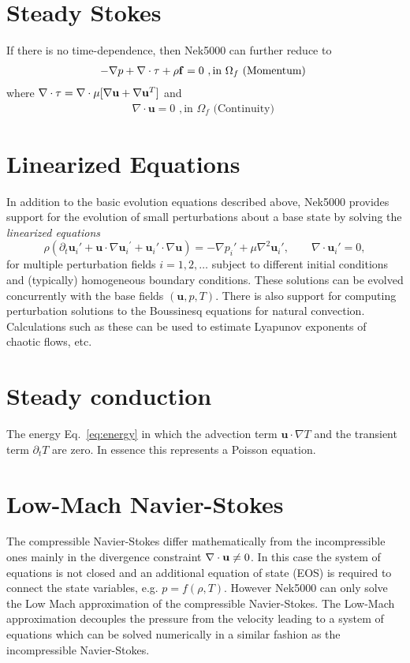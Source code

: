 {\section{Steady Stokes }
If there is no time-dependence, then Nek5000 can further reduce to
\begin{eqnarray}\label{eq:ns_momentum_steady_stokes}
 - \nabla p + \nabla \cdot \tau + \rho {\bf f}=0 \,\, , \text{in } \Omega_f \text{  (Momentum)  }
\end{eqnarray}
where \(\nabla \cdot\tau=\nabla\cdot\mu[\nabla \mathbf{u}+\nabla {\mathbf{u} }^{T}]\) and
\begin{eqnarray}\label{eq:ns_cont_steady_stokes}
 \nabla \cdot \mathbf u =0 \,\, , \text{in } \Omega_f  \text{  (Continuity)  } 
\end{eqnarray}

\section{Linearized Equations}
In addition to the basic evolution equations described above, Nek5000
provides support for the evolution of small perturbations about
a base state by solving the {\em linearized equations}
\begin{equation} \label{eq:pertu}
  \rho(\partial_{t} {\mathbf u_i}' + \mathbf u \cdot \nabla {\mathbf u_i}^{'} + \mathbf u_i' \cdot \nabla \mathbf u) =
   - \nabla p_i' + \mu \nabla^2 \mathbf u_i', \qquad \nabla \cdot \mathbf u_i' = 0,
\end{equation}
for multiple perturbation fields \(i=1,2,\dots\) subject to different initial
conditions and (typically) homogeneous boundary conditions.  
These solutions can be evolved concurrently with the base fields \((\mathbf u,p,T)\).
There is also
support for computing perturbation solutions to the Boussinesq equations for
natural convection.  Calculations such as these can be used to estimate Lyapunov exponents of chaotic flows, etc.



\section{Steady conduction}    
The energy Eq.~\ref{eq:energy} in which the advection term \(\mathbf u \cdot \nabla T\)
    and the transient term \(\partial_{t} T\) are zero. In essence this represents a Poisson equation.
    

\section{Low-Mach Navier-Stokes}\label{sec:lowma}
The compressible Navier-Stokes differ mathematically from the incompressible ones mainly in the divergence constraint \(\nabla \cdot \mathbf{u}\neq 0\). In this case the system of equations is not closed and an additional equation of state (EOS) is required to connect the state variables, e.g. \(p=f(\rho,T)\). However Nek5000 can only solve the Low Mach approximation of the compressible Navier-Stokes. The Low-Mach approximation decouples the pressure from the velocity leading to a system of equations which can be solved numerically in a similar fashion as the incompressible Navier-Stokes.

}
